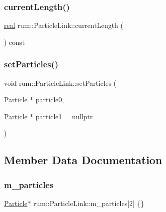 \subsubsection{\texorpdfstring{current\+Length()}{currentLength()}}
{\footnotesize\ttfamily \mbox{\hyperlink{namespacerum_a7e8cca23573d5eaead0f138cbaa4862c}{real}} rum\+::\+Particle\+Link\+::current\+Length (\begin{DoxyParamCaption}{ }\end{DoxyParamCaption}) const\hspace{0.3cm}{\ttfamily [protected]}}

\mbox{\label{classrum_1_1_particle_link_a9c9c83b1752a6b7e8d95658218402128}} 
\subsubsection{\texorpdfstring{set\+Particles()}{setParticles()}}
{\footnotesize\ttfamily void rum\+::\+Particle\+Link\+::set\+Particles (\begin{DoxyParamCaption}\item[{\mbox{\hyperlink{classrum_1_1_particle}{Particle}} $\ast$}]{particle0,  }\item[{\mbox{\hyperlink{classrum_1_1_particle}{Particle}} $\ast$}]{particle1 = {\ttfamily nullptr} }\end{DoxyParamCaption})}



\subsection{Member Data Documentation}
\mbox{\label{classrum_1_1_particle_link_a0a919ccae0b5813620d5010d49094dc7}} 
\subsubsection{\texorpdfstring{m\+\_\+particles}{m\_particles}}
{\footnotesize\ttfamily \mbox{\hyperlink{classrum_1_1_particle}{Particle}}$\ast$ rum\+::\+Particle\+Link\+::m\+\_\+particles\mbox{[}2\mbox{]} \{\}\hspace{0.3cm}{\ttfamily [protected]}}



